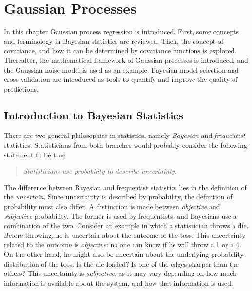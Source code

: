 \documentclass[twoside,english]{uiofysmaster}
\makeatletter
\newenvironment{chapquote}[2][2em]
  {\setlength{\@tempdima}{#1}%
   \def\chapquote@author{#2}%
   \parshape 1 \@tempdima \dimexpr\textwidth-2\@tempdima\relax%
   \itshape}
  {\par\normalfont\hfill--\ \chapquote@author\hspace*{\@tempdima}\par\bigskip}
\makeatother
\begin{document}
{{\chapter{Gaussian Processes}\label{Chapter:Gaussian Processes}



In this chapter Gaussian process regression is introduced. First, some concepts and terminology in Bayesian statistics are reviewed. Then, the concept of covariance, and how it can be determined by covariance functions is explored. Thereafter, the mathematical framework of Gaussian processes is introduced, and the Gaussian noise model is used as an example. Bayesian model selection and cross validation are introduced as tools to quantify and improve the quality of predictions.

\section{Introduction to Bayesian Statistics}

There are two general philosophies in statistics, namely \textit{Bayesian} and \textit{frequentist} statistics. Statisticians from both branches would probably consider the following statement to be true
\begin{quote}
\textit{Statisticians use probability to describe uncertainty.}
\end{quote}
The difference between Bayesian and frequentist statistics lies in the definition of the \textit{uncertain}. Since uncertainty is described by probability, the definition of probability must also differ. A distinction is made between \textit{objective} and \textit{subjective} probability. The former is used by frequentists, and Bayesians use a combination of the two. Consider an example in which a statistician throws a die. Before throwing, he is uncertain about the outcome of the toss. This uncertainty related to the outcome is \textit{objective}: no one can know if he will throw a 1 or a 4. On the other hand, he might also be uncertain about the underlying probability distribution of the toss. Is the die loaded? Is one of the edges sharper than the others? This uncertainty is \textit{subjective}, as it may vary depending on how much information is available about the system, and how that information is used. 

}}
\end{document}
